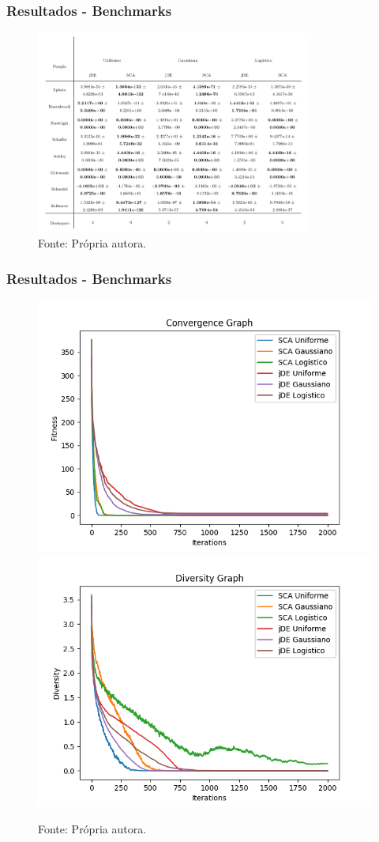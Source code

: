 \documentclass{beamer}
\newcommand{\source}[1]{\vspace{-6pt} \caption*{Fonte: {#1}} }
\begin{document}
\begin{frame}
\frametitle{Resultados - Benchmarks}
\begin{figure}[tbph]
\centering
\includegraphics[width=0.8\textwidth]{tabelaBenchmarks1.png}
\source{Própria autora.}
\label{tab:resBench1}
\end{figure}
\end{frame}

\begin{frame}
\frametitle{Resultados - Benchmarks}
\begin{figure}[tbph]
\centering
\includegraphics[width=0.49\linewidth]{convRastrigin.png}
\includegraphics[width=0.49\linewidth]{divRastrigin.png}
\source{Própria autora.}
\label{fig:grafSphere}
\end{figure}
\end{frame}
\end{document}
